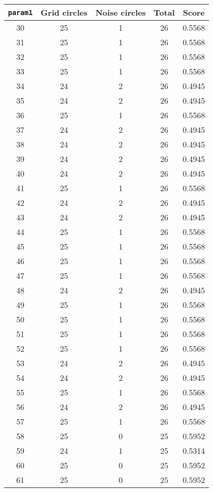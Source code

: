 \documentclass[letterpaper, 12pt]{article}
\begin{document}
\begin{longtable}{|c|c|c|c|c|}
\hline
\textbf{\texttt{param1}} & \textbf{Grid circles} & \textbf{Noise circles} & \textbf{Total} & \textbf{Score} \\
\hline
30 & 25 & 1 & 26 & 0.5568 \\
\hline
31 & 25 & 1 & 26 & 0.5568 \\
\hline
32 & 25 & 1 & 26 & 0.5568 \\
\hline
33 & 25 & 1 & 26 & 0.5568 \\
\hline
34 & 24 & 2 & 26 & 0.4945 \\
\hline
35 & 24 & 2 & 26 & 0.4945 \\
\hline
36 & 25 & 1 & 26 & 0.5568 \\
\hline
37 & 24 & 2 & 26 & 0.4945 \\
\hline
38 & 24 & 2 & 26 & 0.4945 \\
\hline
39 & 24 & 2 & 26 & 0.4945 \\
\hline
40 & 24 & 2 & 26 & 0.4945 \\
\hline
41 & 25 & 1 & 26 & 0.5568 \\
\hline
42 & 24 & 2 & 26 & 0.4945 \\
\hline
43 & 24 & 2 & 26 & 0.4945 \\
\hline
44 & 25 & 1 & 26 & 0.5568 \\
\hline
45 & 25 & 1 & 26 & 0.5568 \\
\hline
46 & 25 & 1 & 26 & 0.5568 \\
\hline
47 & 25 & 1 & 26 & 0.5568 \\
\hline
48 & 24 & 2 & 26 & 0.4945 \\
\hline
49 & 25 & 1 & 26 & 0.5568 \\
\hline
50 & 25 & 1 & 26 & 0.5568 \\
\hline
51 & 25 & 1 & 26 & 0.5568 \\
\hline
52 & 25 & 1 & 26 & 0.5568 \\
\hline
53 & 24 & 2 & 26 & 0.4945 \\
\hline
54 & 24 & 2 & 26 & 0.4945 \\
\hline
55 & 25 & 1 & 26 & 0.5568 \\
\hline
56 & 24 & 2 & 26 & 0.4945 \\
\hline
57 & 25 & 1 & 26 & 0.5568 \\
\hline
58 & 25 & 0 & 25 & 0.5952 \\
\hline
59 & 24 & 1 & 25 & 0.5314 \\
\hline
60 & 25 & 0 & 25 & 0.5952 \\
\hline
61 & 25 & 0 & 25 & 0.5952 \\

\end{longtable}
\end{document}

